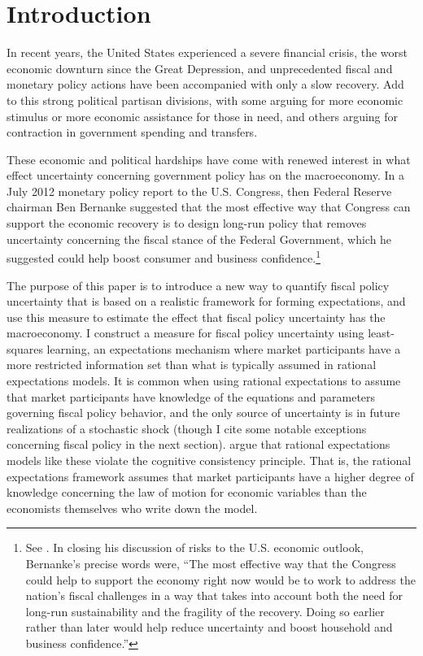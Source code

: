 \documentclass[11pt]{article}
\newcommand{\citee}[1]{\citet{#1}}
\begin{document}
\section{Introduction}

In recent years, the United States experienced a severe financial crisis, the worst economic downturn since the Great Depression, and unprecedented fiscal and monetary policy actions have been accompanied with only a slow recovery.  Add to this strong political partisan divisions, with some arguing for more economic stimulus or more economic assistance for those in need, and others arguing for contraction in government spending and transfers. 

These economic and political hardships have come with renewed interest in what effect uncertainty concerning government policy has on the macroeconomy.  In a July 2012 monetary policy report to the U.S. Congress, then Federal Reserve chairman Ben Bernanke suggested that the most effective way that Congress can support the economic recovery is to design long-run policy that removes uncertainty concerning the fiscal stance of the Federal Government, which he suggested could help boost consumer and business confidence.\footnote{See \citee{bernanke2012}.  In closing his discussion of risks to the U.S. economic outlook, Bernanke's precise words were, ``The most effective way that the Congress could help to support the economy right now would be to work to address the nation's fiscal challenges in a way that takes into account both the need for long-run sustainability and the fragility of the recovery. Doing so earlier rather than later would help reduce uncertainty and boost household and business confidence.''}  

The purpose of this paper is to introduce a new way to quantify fiscal policy uncertainty that is based on a realistic framework for forming expectations, and use this measure to estimate the effect that fiscal policy uncertainty has the macroeconomy.  I construct a measure for fiscal policy uncertainty using least-squares learning, an expectations mechanism where market participants have a more restricted information set than what is typically assumed in rational expectations models.  It is common when using rational expectations to assume that market participants have knowledge of the equations and parameters governing fiscal policy behavior, and the only source of uncertainty is in future realizations of a stochastic shock (though I cite some notable exceptions concerning fiscal policy in the next section).  \citee{eh2011} argue that rational expectations models like these violate the cognitive consistency principle.  That is, the rational expectations framework assumes that market participants have a higher degree of knowledge concerning the law of motion for economic variables than the economists themselves who write down the model.  
\end{document}
